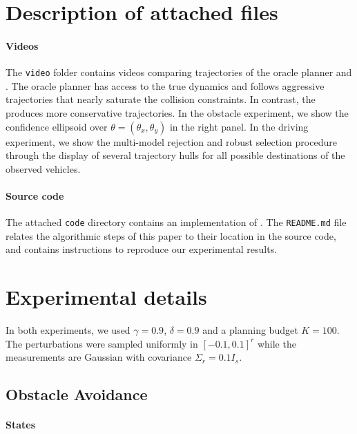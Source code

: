 \documentclass{article}
\begin{document}
\section{Description of attached files}
\label{sec:attachments}

\paragraph{Videos}
The \texttt{video} folder contains videos comparing trajectories of the oracle planner and . The oracle planner has access to the true dynamics and follows aggressive trajectories that nearly saturate the collision constraints. In contrast, the  produces more conservative trajectories. In the obstacle experiment, we show the confidence ellipsoid over $\theta = (\theta_x,\theta_y)$ in the right panel. In the driving experiment, we show the multi-model rejection and robust selection procedure through the display of several trajectory hulls for all possible destinations of the observed vehicles.

\paragraph{Source code}
The attached \texttt{code} directory contains an implementation of . The \texttt{README.md} file relates the algorithmic steps of this paper to their location in the source code, and contains instructions to reproduce our experimental results.

\section{Experimental details}
\label{sec:experimental-setting}

In both experiments, we used $\gamma=0.9$,  $\delta=0.9$ and a planning budget $K=100$. The perturbations were sampled uniformly in $[-0.1, 0.1]^r$ while the measurements are Gaussian with covariance $\Sigma_r = 0.1 I_s$. 

\subsection{Obstacle Avoidance}

\paragraph{States}
\end{document}
